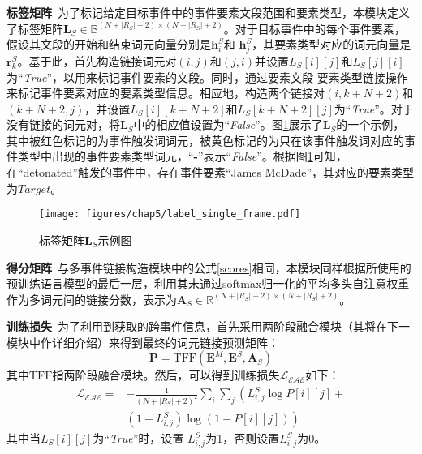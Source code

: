 \textbf{标签矩阵}~为了标记给定目标事件中的事件要素文段范围和要素类型，本模块定义了标签矩阵$\boldsymbol{L}_{S} \in {\mathbb{B}}^{(N+|R_{S}|+2) \times (N+|R_{S}|+2)}$。对于目标事件中的每个事件要素，假设其文段的开始和结束词元向量分别是$\boldsymbol{h}_{i}^{S}$和 $\boldsymbol{h}_{j}^{S}$，其要素类型对应的词元向量是$\boldsymbol{r}_{k}^{S}$。基于此，首先构造链接词元对$(i,j)$和$(j,i)$并设置${L}_{S}[i][j]$和${L}_{S}[j][i]$为“\emph{True}”，以用来标记事件要素的文段。同时，通过要素文段-要素类型链接操作来标记事件要素对应的要素类型信息。相应地，构造两个链接对$(i,k+N+2)$和$(k+N+2,j)$，并设置${L}_{S}[i][k+N+2]$和${L}_{S}[k+N+2][j]$为“\emph{True}”。对于没有链接的词元对，将$\boldsymbol{L}_{S}$中的相应值设置为“\emph{False}”。图\ref{single_event_label}展示了$\boldsymbol{L}_{S}$的一个示例，其中被红色标记的为事件触发词词元，被黄色标记的为只在该事件触发词对应的事件类型中出现的事件要素类型词元，“\textbf{-}”表示“\emph{False}”。根据图\ref{single_event_label}可知，在“detonated”触发的事件中，存在事件要素“James McDade”，其对应的要素类型为$Target$。

\begin{figure}[htp]
\centering
\texttt{[image: figures/chap5/label\_single\_frame.pdf]}
\caption{标签矩阵$\boldsymbol{L}_{S}$示例图}
\label{single_event_label}
\end{figure}

\textbf{得分矩阵}~与多事件链接构造模块中的公式\ref{scores}相同，本模块同样根据所使用的预训练语言模型的最后一层，利用其未通过softmax归一化的平均多头自注意权重作为多词元间的链接分数，表示为$\boldsymbol{A}_{S} \in {\mathbb{R}}^{(N+|R_{S}|+2) \times (N+|R_{S}|+2)}$。

\textbf{训练损失}~为了利用到获取的跨事件信息，首先采用两阶段融合模块（其将在下一模块中作详细介绍）来得到最终的词元链接预测矩阵：
\begin{equation}
\boldsymbol{P} =\textrm{TFF}(\boldsymbol{E}^{M},\boldsymbol{E}^{S},\boldsymbol{A}_{S})
\end{equation} 
其中$\textrm{TFF}$指两阶段融合模块。然后，可以得到训练损失$\mathcal{L_\textrm{EAE}}$如下：\begin{equation}
\label{binary}
\begin{split}
    \mathcal{L_\textrm{EAE}} = & -\frac{1}{(N+|R_{S}|+2)^2} \sum_i \sum_j\left(L^{S}_{i,j} \log {P}[i][j] + \right. \\
    & \left. (1-L^{S}_{i,j}) \log \left(1- {P}[i][j]\right) \right)
\end{split}
\end{equation} 
其中当${L}_{S}[i][j]$为“\emph{True}”时，设置
$L^{S}_{i,j}$为1，否则设置$L^{S}_{i,j}$为0。

